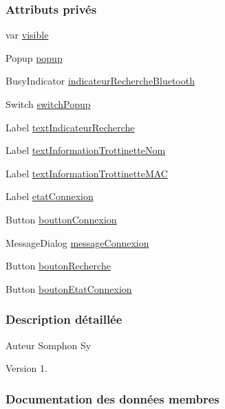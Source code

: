 \subsubsection*{Attributs privés}
\begin{DoxyCompactItemize}
\item 
var \hyperlink{class_page_accueil_ae03956f235445b0802fbf9734b5c0388}{visible}
\item 
Popup \hyperlink{class_page_accueil_aba6d2877963eef2814a6fb7e994075de}{popup}
\item 
Busy\+Indicator \hyperlink{class_page_accueil_a52eb00d78f1e124f7157b76a0a971a46}{indicateur\+Recherche\+Bluetooth}
\item 
Switch \hyperlink{class_page_accueil_ae90456d8a42418d4657ddc563396b9da}{switch\+Popup}
\item 
Label \hyperlink{class_page_accueil_a808229add302b2754652774b07c90f75}{text\+Indicateur\+Recherche}
\item 
Label \hyperlink{class_page_accueil_acf7a4bb8798fe118632bf214600b56af}{text\+Information\+Trottinette\+Nom}
\item 
Label \hyperlink{class_page_accueil_ab5eca979dc44c0a4dc0f167fd1f37864}{text\+Information\+Trottinette\+M\+AC}
\item 
Label \hyperlink{class_page_accueil_a482152aaa6e321fab3b08c430b476f8f}{etat\+Connexion}
\item 
Button \hyperlink{class_page_accueil_a492c15a155aca7aae1fdab5bdbebedf2}{boutton\+Connexion}
\item 
Message\+Dialog \hyperlink{class_page_accueil_a094ce2a64386624d9443553a6524ca28}{message\+Connexion}
\item 
Button \hyperlink{class_page_accueil_a7efda9a58fdc87fad2bd6cdb60ec37d5}{bouton\+Recherche}
\item 
Button \hyperlink{class_page_accueil_ab974023098658affd679fc4c37ba945c}{bouton\+Etat\+Connexion}
\end{DoxyCompactItemize}


\subsubsection{Description détaillée}
\begin{DoxyAuthor}{Auteur}
Somphon Sy
\end{DoxyAuthor}
\begin{DoxyVersion}{Version}
1. 
\end{DoxyVersion}


\subsubsection{Documentation des données membres}
\mbox{\label{class_page_accueil_ab974023098658affd679fc4c37ba945c}} 
